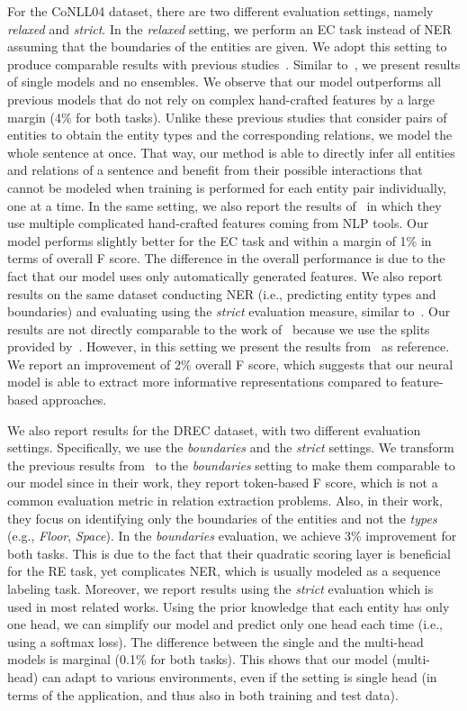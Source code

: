 \documentclass[review]{elsarticle}
\newcommand{\eg}{e.g., }
\newcommand{\ie}{i.e., }
\begin{document}
For the CoNLL04 dataset, there are two different evaluation settings, namely \emph{relaxed} and \emph{strict}. In the \emph{relaxed} setting, we perform an EC task instead of NER assuming that the boundaries of the entities are given. We adopt this setting to produce comparable results with previous studies~\citep{gupta:16,heike:17}. Similar to~\cite{heike:17}, we present results of single models and no ensembles. We observe that our model outperforms all previous models that do not rely on complex hand-crafted features by a large margin (4\% for both tasks). Unlike these previous studies that consider pairs of entities to obtain the entity types and the corresponding relations, we model the whole sentence at once. That way, our method is able to directly infer all entities and relations of a sentence and benefit from their possible interactions that cannot be modeled when training is performed for each entity pair individually, one at a time. In the same setting, we also report the results of~\cite{gupta:16} in which they use multiple complicated hand-crafted features coming from NLP tools. Our model performs slightly better for the EC task and within a margin of 1\% in terms of overall F score. The difference in the overall performance is due to the fact that our model uses only automatically generated features. 
We also report results on the same dataset conducting NER (\ie predicting entity types and boundaries) and evaluating using the \emph{strict} evaluation measure, similar to~\cite{miwa:14}. Our results are not directly comparable  to the work of~\cite{miwa:14} because we use the splits provided by~\cite{gupta:16}. However, in this setting we present the results from~\cite{miwa:14} as reference. We report an improvement of 2\% overall F score, which suggests that our neural model is able to extract more informative representations compared to feature-based approaches.

We also report results for the DREC dataset, with two different evaluation settings. Specifically, we use the \emph{boundaries} and the \emph{strict} settings. We transform the previous results from~\cite{bekoulis:18} to the \emph{boundaries} setting to make them comparable to our model since in their work, they report token-based F score, which is not a common evaluation metric in relation extraction problems. Also, in their work, they focus on identifying only the boundaries of the entities and not the \emph{types} (\eg \emph{Floor}, \emph{Space}). In the \emph{boundaries} evaluation, we achieve 3\% improvement for both tasks. This is due to the fact that their quadratic scoring layer is beneficial for the RE task, yet complicates NER, which is usually modeled as a sequence labeling task. Moreover, we report results using the \emph{strict} evaluation which is used in most related works. Using the prior knowledge that each entity has only one head, we can simplify our model and predict only one head each time (\ie using a softmax loss). The difference between the single and the multi-head models is marginal (0.1\% for both tasks). This shows that our model (multi-head) can adapt to various environments, even if the setting is single head (in terms of the application, and thus also in both training and test data).
\end{document}
